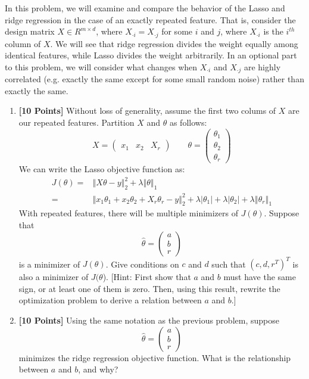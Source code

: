 \documentclass{article}
\begin{document}
In this problem, we will examine and compare the behavior of the Lasso
and ridge regression in the case of an exactly repeated feature. That
is, consider the design matrix $X\in R^{m\times d}$, where $X_{\cdot i}=X_{\cdot j}$
for some $i$ and $j$, where $X_{\cdot i}$ is the $i^{th}$ column
of $X$. We will see that ridge regression divides the weight equally
among identical features, while Lasso divides the weight arbitrarily.
In an optional part to this problem, we will consider what changes
when $X_{\cdot i}$ and $X_{\cdot j}$ are highly correlated (e.g.
exactly the same except for some small random noise) rather than exactly
the same. 
\begin{enumerate}
\item {\bf [10 Points]} Without loss of generality, assume the first two colums of $X$ are
our repeated features. Partition $X$ and $\theta$ as follows:\\
\[
X=\left(\begin{array}{ccc}
x_{1} & x_{2} & X_{r}\end{array}\right)\qquad\theta=\left(\begin{array}{c}
\theta_{1}\\
\theta_{2}\\
\theta_{r}
\end{array}\right)
\]
We can write the Lasso objective function as:
\begin{align*}
J(\theta)= & \left\Vert X\theta-y\right\Vert _{2}^{2}+\lambda\left\Vert \theta\right\Vert _{1}\\
= & \left\Vert x_{1}\theta_{1}+x_{2}\theta_{2}+X_{r}\theta_{r}-y\right\Vert _{2}^{2}+\lambda\vert\theta_{1}\vert+\lambda\vert\theta_{2}\vert+\lambda\left\Vert \theta_{r}\right\Vert _{1}
\end{align*}
With repeated features, there will be multiple minimizers of $J(\theta)$.
Suppose that 
\[
\hat{\theta}=\begin{pmatrix}a\\
b\\
r
\end{pmatrix}
\]
is a minimizer of $J(\theta)$. Give conditions on $c$ and $d$ such
that $\left(c,d,r^{T}\right)^{T}$ is also a minimizer of $J(\theta$).
{[}Hint: First show that $a$ and $b$ must have the same sign, or
at least one of them is zero. Then, using this result, rewrite the
optimization problem to derive a relation between $a$ and $b$.{]}\\
\item {\bf [10 Points]} Using the same notation as the previous problem, suppose 
\[
\hat{\theta}=\begin{pmatrix}a\\
b\\
r
\end{pmatrix}
\]
minimizes the ridge regression objective function. What is the relationship
between $a$ and $b$, and why? \\
\end{enumerate}
\end{document}
